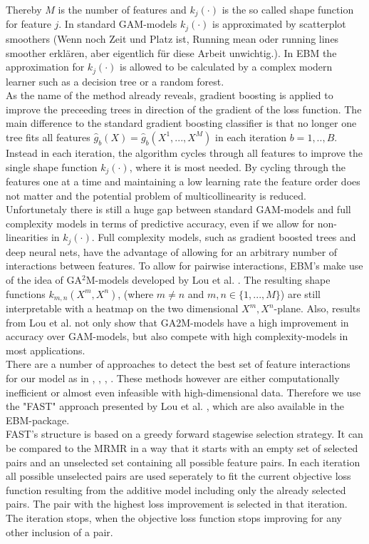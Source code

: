 \documentclass[12pt,titlepage]{article}
\begin{document}
Thereby $M$ is the number of features and $k_{j}(\cdot)$ is the so called shape function for feature $j$. In standard GAM-models $k_{j}(\cdot)$ is approximated by scatterplot smoothers (Wenn noch Zeit und Platz ist, Running mean oder running lines smoother erklären, aber eigentlich für diese Arbeit unwichtig.). In EBM the approximation for $k_{j}(\cdot)$ is allowed to be calculated by a complex modern learner such as a decision tree or a random forest. \\
As the name of the method already reveals, gradient boosting is applied to improve the preceeding trees in direction of the gradient of the loss function. The main difference to the standard gradient boosting classifier is that no longer one tree fits all features $\hat{g}_{b}(X)=\hat{g}_{b}(X^{1}, ..., X^{M})$ in each iteration $b=1,..,B$. Instead in each iteration, the algorithm cycles through all features to improve the single shape function $k_{j}(\cdot)$, where it is most needed. By cycling through the features one at a time and maintaining a low learning rate the feature order does not matter and the potential problem of multicollinearity is reduced. \\
Unfortunetaly there is still a huge gap between standard GAM-models and full complexity models in terms of predictive accuracy, even if we allow for non-linearities in $k_{j}(\cdot)$. Full complexity models, such as gradient boosted trees and deep neural nets, have the advantage of allowing for an arbitrary number of interactions between features. To allow for pairwise interactions, EBM's make use of the idea of GA$^{2}$M-models developed by Lou et al. \cite{ga2m}. The resulting shape functions $k_{m,n}(X^{m}, X^{n})$, (where $m\neq n$ and $m,n \in \{1,...,M\}$) are still interpretable with a heatmap on the two dimensional $X^{m}, X^{n}$-plane. Also, results from Lou et al. not only show that GA2M-models have a high improvement in accuracy over GAM-models, but also compete with high complexity-models in most applications. \\
There are a number of approaches to detect the best set of feature interactions for our model as in \cite{anova_interaction}, \cite{pdf_interaction}, \cite{guide}, \cite{grove}. These methods however are either computationally inefficient or almost even infeasible with high-dimensional data. Therefore we use the "FAST" approach presented by Lou et al. \cite{ga2m}, which are also available in the EBM-package. \\
FAST's structure is based on a greedy forward stagewise selection strategy. It can be compared to the MRMR in a way that it starts with an empty set of selected pairs and an unselected set containing all possible feature pairs. In each iteration all possible unselected pairs are used seperately to fit the current objective loss function resulting from the additive model including only the already selected pairs. The pair with the highest loss improvement is selected in that iteration. The iteration stops, when the objective loss function stops improving for any other inclusion of a pair. \\
\end{document}
